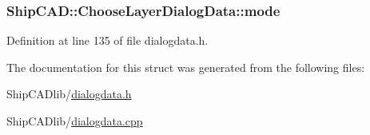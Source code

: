 \subsubsection[{\texorpdfstring{mode}{mode}}]{ Ship\+C\+A\+D\+::\+Choose\+Layer\+Dialog\+Data\+::mode}\hypertarget{structShipCAD_1_1ChooseLayerDialogData_a02ef288b4786baafa763a397c6d5dc59}{}\label{structShipCAD_1_1ChooseLayerDialogData_a02ef288b4786baafa763a397c6d5dc59}


Definition at line 135 of file dialogdata.\+h.



The documentation for this struct was generated from the following files\+:\begin{DoxyCompactItemize}
\item 
Ship\+C\+A\+Dlib/\hyperlink{dialogdata_8h}{dialogdata.\+h}\item 
Ship\+C\+A\+Dlib/\hyperlink{dialogdata_8cpp}{dialogdata.\+cpp}\end{DoxyCompactItemize}
